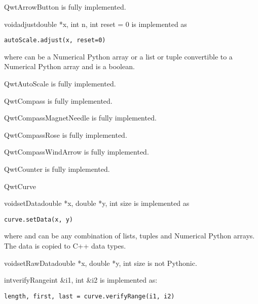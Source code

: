 \documentclass{manual}
\begin{document}
\begin{classdesc*}{QwtArrowButton}
  is fully implemented.

  \begin{cfuncdesc}{void}{adjust}{double *x, int n, int reset = 0}
    is implemented as
    \begin{verbatim}
autoScale.adjust(x, reset=0)
    \end{verbatim}
    where  can be a Numerical Python array or a list or tuple
    convertible to a Numerical Python array and  is a boolean.
  \end{cfuncdesc}

\end{classdesc*}

\begin{classdesc*}{QwtAutoScale}
  is fully implemented.
\end{classdesc*}

\begin{classdesc*}{QwtCompass}
  is fully implemented.
\end{classdesc*}

\begin{classdesc*}{QwtCompassMagnetNeedle}
  is fully implemented.
\end{classdesc*}

\begin{classdesc*}{QwtCompassRose}
  is fully implemented.
\end{classdesc*}

\begin{classdesc*}{QwtCompassWindArrow}
  is fully implemented.
\end{classdesc*}

\begin{classdesc*}{QwtCounter}
  is fully implemented.
\end{classdesc*}

\begin{classdesc*}{QwtCurve}

  \begin{cfuncdesc}{void}{setData}{double *x, double *y, int size}
    is implemented as
    \begin{verbatim}
curve.setData(x, y)
    \end{verbatim}
    where  and  can be any combination of lists, tuples and
    Numerical Python arrays.  The data is copied to C++ data types.
  \end{cfuncdesc}

  \begin{cfuncdesc}{void}{setRawData}{double *x, double *y, int size}
      is not Pythonic.
  \end{cfuncdesc}

  \begin{cfuncdesc}{int}{verifyRange}{int \&i1, int \&i2}
    is implemented as:
    \begin{verbatim}
length, first, last = curve.verifyRange(i1, i2)
    \end{verbatim}
  \end{cfuncdesc}

\end{classdesc*}
\end{document}
